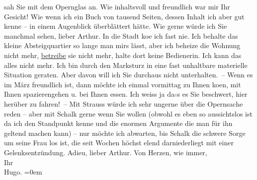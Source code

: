 \begin{ledgroupsized}[t]{13cm}
               sah Sie mit dem Opernglas an. Wie inhaltsvoll und freundlich war mir Ihr Gesicht! Wie
               wenn ich ein Buch von tausend Seiten, dessen Inhalt ich aber gut kenne – in einem
               Augenblick überblättert hätte.\pend
           \pstart
           Wie gerne würde ich Sie manchmal sehen, lieber Arthur. In die Stadt ko{\geminationm}e ich fast nie. Ich behalte das kleine Absteigquartier
               so lange man mirs lässt, aber ich beheize die Wohnung nicht mehr, \uline{betreibe} sie nicht mehr, halte dort keine Bedienerin. Ich
               kann das alles nicht mehr. Ich bin durch den Marksturz in eine fast unhaltbare
               materielle Situation geraten. Aber davon will {\pb}ich Sie durchaus nicht
               unterhalten. – Wenn es im März freundlich ist, dann möchte ich einmal
               vormittag zu Ihnen ko{\geminationm}en, mit Ihnen spazierengehen u.
               bei Ihnen essen. Ich weiss ja da\textcolor{gray}{s}s es Sie beschwert, hier herüber
               zu fahren! –\pend
           \pstart
           Mit Strauss würde ich sehr ungerne über die
                  Opernsache reden – aber mit
                  Schalk gerne wenn Sie wollen (obwohl es
               eben so aussichtslos ist da ich den Standpunkt kenne und die enormen Argumente die
               man für ihn geltend machen kann) – nur möchte ich abwarten, bis Schalk die schwere Sorge um seine Frau los ist, die seit Wochen höchst elend
               darniederliegt mit einer Gelenksentzündung.\pend
           \pstart
           Adieu, lieber Arthur.\pend
           \pstart
           Von Herzen, wie immer,{\\[\baselineskip]}Ihr{\\[\baselineskip]}\spacefill\mbox{Hugo.}\pend
           \leftskip=0em{}
         
         \endnumbering{}\end{ledgroupsized}  \newcommand{\dateiname}{L02396}\newcommand{\titel}{Hugo Hofmannsthal an Arthur Schnitzler, 16. 1. 1923}\newcommand{\editorInnen}{Martin Anton Müller und Gerd-Hermann Susen}
      